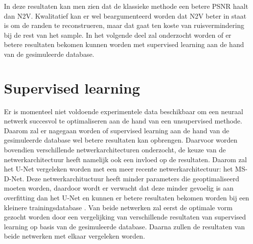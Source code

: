 \documentclass{report}
\begin{document}
In deze resultaten kan men zien dat de klassieke methode een betere PSNR haalt dan N2V. Kwalitatief kan er wel beargumenteerd worden dat N2V beter in staat is om de randen te reconstrueren, maar dat gaat ten koste van ruisvermindering bij de rest van het sample. In het volgende deel zal onderzocht worden of er betere resultaten bekomen kunnen worden met supervised learning aan de hand van de gesimuleerde database.


\section{Supervised learning} \label{ch:architecture}
Er is momenteel niet voldoende experimentele data beschikbaar om een neuraal netwerk succesvol te optimaliseren aan de hand van een unsupervised methode. Daarom zal er nagegaan worden of supervised learning aan de hand van de gesimuleerde database wel betere resultaten kan opbrengen. Daarvoor worden bovendien verschillende netwerkarchitecturen onderzocht, de keuze van de netwerkarchitectuur heeft namelijk ook een invloed op de resultaten. Daarom zal het U-Net vergeleken worden met een meer recente netwerkarchitectuur: het MS-D-Net. Deze netwerkarchituctuur heeft minder parameters die geoptimaliseerd moeten worden, daardoor wordt er verwacht dat deze minder gevoelig is aan overfitting dan het U-Net en kunnen er betere resultaten bekomen worden bij een kleinere trainingsdatabase \cite{paper:msdnet}. Van beide netwerken zal eerst de optimale vorm gezocht worden door een vergelijking van verschillende resultaten van supervised learning op basis van de gesimuleerde database. Daarna zullen de resultaten van beide netwerken met elkaar vergeleken worden.
\end{document}
